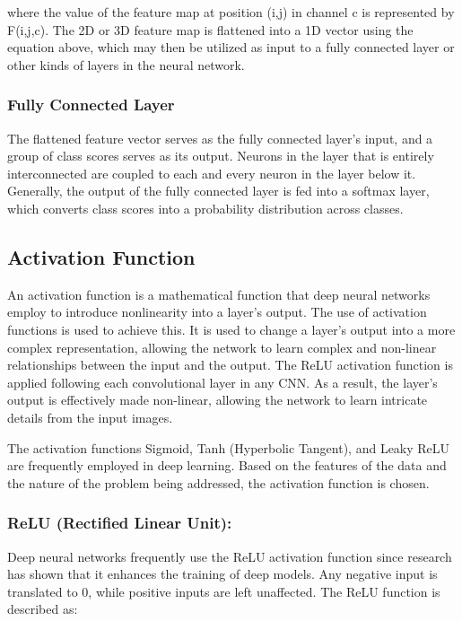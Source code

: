 
where the value of the feature map at position (i,j) in channel c is represented by F(i,j,c). The 2D or 3D feature map is flattened into a 1D vector using the equation above, which may then be utilized as input to a fully connected layer or other kinds of layers in the neural network.

\subsubsection{Fully Connected Layer}
The flattened feature vector serves as the fully connected layer's input, and a group of class scores serves as its output. Neurons in the layer that is entirely interconnected are coupled to each and every neuron in the layer below it. Generally, the output of the fully connected layer is fed into a softmax layer, which converts class scores into a probability distribution across classes.

\subsection{Activation Function}
An activation function is a mathematical function that deep neural networks employ to introduce nonlinearity into a layer's output. The use of activation functions is used to achieve this. It is used to change a layer's output into a more complex representation, allowing the network to learn complex and non-linear relationships between the input and the output. The ReLU activation function is applied following each convolutional layer in any CNN. As a result, the layer's output is effectively made non-linear, allowing the network to learn intricate details from the input images.

The activation functions Sigmoid, Tanh (Hyperbolic Tangent), and Leaky ReLU are frequently employed in deep learning. Based on the features of the data and the nature of the problem being addressed, the activation function is chosen.

\subsubsection{ReLU (Rectified Linear Unit):}
Deep neural networks frequently use the ReLU activation function since research has shown that it enhances the training of deep models. Any negative input is translated to 0, while positive inputs are left unaffected. The ReLU function is described as:

